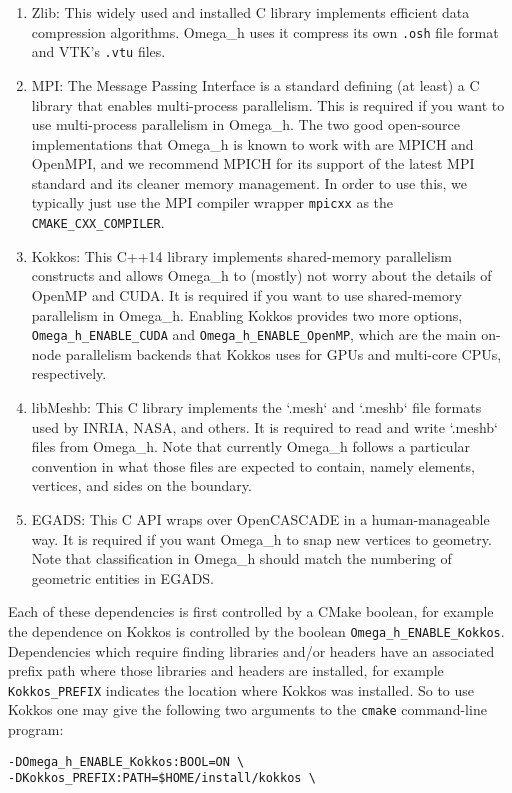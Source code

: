 \documentclass{article}
\begin{document}
\begin{enumerate}

\item Zlib: This widely used and installed C library implements
efficient data compression algorithms.
Omega\_h uses it compress its own \texttt{.osh} file format and
VTK's \texttt{.vtu} files.

\item MPI: The Message Passing Interface is a standard
defining (at least) a C library that enables multi-process parallelism.
This is required if you want to use multi-process parallelism
in Omega\_h.
The two good open-source implementations that Omega\_h is known
to work with are MPICH and OpenMPI, and we recommend
MPICH for its support of the latest MPI standard and its
cleaner memory management.
In order to use this, we typically just use the MPI compiler wrapper
\texttt{mpicxx} as the \texttt{CMAKE\_CXX\_COMPILER}.

\item Kokkos: This C++14 library implements shared-memory parallelism
constructs and allows Omega\_h to (mostly) not worry about the details
of OpenMP and CUDA.
It is required if you want to use shared-memory parallelism in Omega\_h.
Enabling Kokkos provides two more options, \texttt{Omega\_h\_ENABLE\_CUDA}
and \texttt{Omega\_h\_ENABLE\_OpenMP}, which are the main on-node
parallelism backends that Kokkos uses for GPUs and multi-core CPUs,
respectively.

\item libMeshb: This C library implements the `.mesh` and `.meshb`
file formats used by INRIA, NASA, and others.
It is required to read and write `.meshb` files from Omega\_h.
Note that currently Omega\_h follows a particular convention in what
those files are expected to contain, namely elements, vertices,
and sides on the boundary.

\item EGADS: This C API wraps over OpenCASCADE in a human-manageable way.
It is required if you want Omega\_h to snap new vertices to geometry.
Note that classification in Omega\_h should match the numbering
of geometric entities in EGADS.

\end{enumerate}

Each of these dependencies is first controlled by a CMake boolean,
for example the dependence on Kokkos is controlled by the boolean
\texttt{Omega\_h\_ENABLE\_Kokkos}.
Dependencies which require finding libraries and/or headers have
an associated prefix path where those libraries and headers are installed,
for example \texttt{Kokkos\_PREFIX} indicates the location where
Kokkos was installed.
So to use Kokkos one may give the following two arguments to the
\texttt{cmake} command-line program:
\begin{lstlisting}
-DOmega_h_ENABLE_Kokkos:BOOL=ON \
-DKokkos_PREFIX:PATH=$HOME/install/kokkos \
\end{lstlisting}
\end{document}

